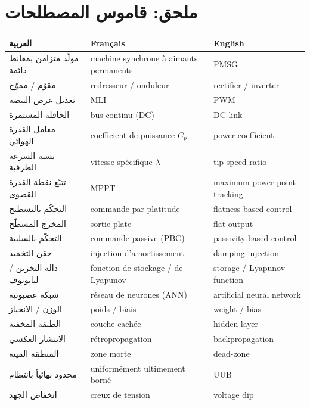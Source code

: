 \documentclass[11pt,a4paper]{article}
\newcommand{\fr}[1]{\textfrench{#1}}
\begin{document}
\section*{ملحق: قاموس المصطلحات}
\begin{center}
\begin{tabular}{lll}
\toprule
العربية & \fr{Français} & \fr{English}\\
\midrule
مولّد متزامن بمغانط دائمة & \fr{machine synchrone à aimants permanents} & \fr{PMSG}\\
مقوّم / مموّج & \fr{redresseur / onduleur} & \fr{rectifier / inverter}\\
تعديل عرض النبضة & \fr{MLI} & \fr{PWM}\\
الحافلة المستمرة & \fr{bus continu (DC)} & \fr{DC link}\\
معامل القدرة الهوائي & \fr{coefficient de puissance $C_p$} & \fr{power coefficient}\\
نسبة السرعة الطرفية & \fr{vitesse spécifique $\lambda$} & \fr{tip-speed ratio}\\
تتبّع نقطة القدرة القصوى & \fr{MPPT} & \fr{maximum power point tracking}\\
التحكّم بالتسطيح & \fr{commande par platitude} & \fr{flatness-based control}\\
المخرج المسطّح & \fr{sortie plate} & \fr{flat output}\\
التحكّم بالسلبية & \fr{commande passive (PBC)} & \fr{passivity-based control}\\
حقن التخميد & \fr{injection d'amortissement} & \fr{damping injection}\\
دالة التخزين / ليابونوف & \fr{fonction de stockage / de Lyapunov} & \fr{storage / Lyapunov function}\\
شبكة عصبونية & \fr{réseau de neurones (ANN)} & \fr{artificial neural network}\\
الوزن / الانحياز & \fr{poids / biais} & \fr{weight / bias}\\
الطبقة المخفية & \fr{couche cachée} & \fr{hidden layer}\\
الانتشار العكسي & \fr{rétropropagation} & \fr{backpropagation}\\
المنطقة الميتة & \fr{zone morte} & \fr{dead-zone}\\
محدود نهائياً بانتظام & \fr{uniformément ultimement borné} & \fr{UUB}\\
انخفاض الجهد & \fr{creux de tension} & \fr{voltage dip}\\
\bottomrule
\end{tabular}
\end{center}
\end{document}
